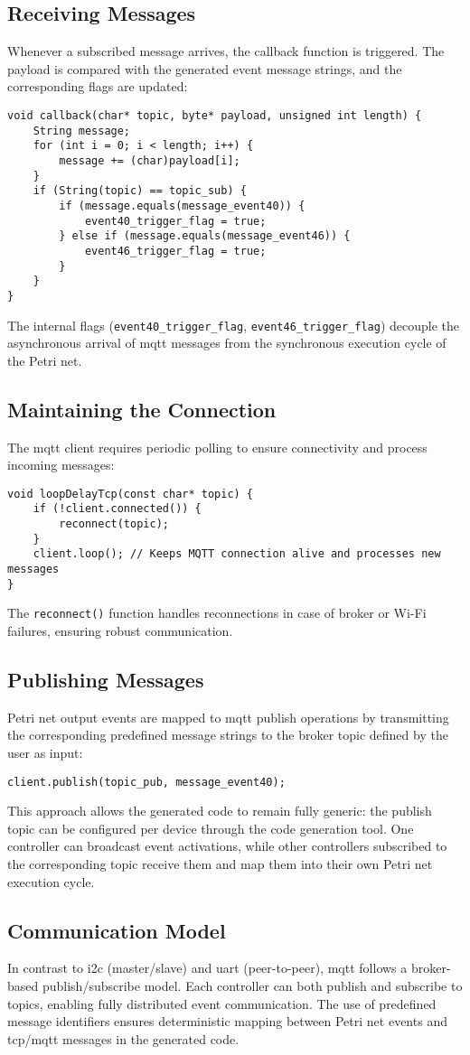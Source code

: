\subsection{Receiving Messages}
Whenever a subscribed message arrives, the callback function is triggered. The payload is compared with the generated event message strings, and the corresponding flags are updated:
\begin{verbatim}
void callback(char* topic, byte* payload, unsigned int length) {
    String message;
    for (int i = 0; i < length; i++) {
        message += (char)payload[i];
    }
    if (String(topic) == topic_sub) {
        if (message.equals(message_event40)) {
            event40_trigger_flag = true;
        } else if (message.equals(message_event46)) {
            event46_trigger_flag = true;
        }
    }
}
\end{verbatim}
The internal flags (\texttt{event40\_trigger\_flag}, \texttt{event46\_trigger\_flag}) decouple the asynchronous arrival of \gls{mqtt} messages from the synchronous execution cycle of the Petri net.

\subsection{Maintaining the Connection}
The \gls{mqtt} client requires periodic polling to ensure connectivity and process incoming messages:
\begin{verbatim}
void loopDelayTcp(const char* topic) {
    if (!client.connected()) {
        reconnect(topic);
    }
    client.loop(); // Keeps MQTT connection alive and processes new messages
}
\end{verbatim}
The \texttt{reconnect()} function handles reconnections in case of broker or Wi-Fi failures, ensuring robust communication.

\subsection{Publishing Messages}
Petri net output events are mapped to \gls{mqtt} publish operations by transmitting the corresponding predefined message strings to the broker topic defined by the user as input:
\begin{verbatim}
client.publish(topic_pub, message_event40);
\end{verbatim}
This approach allows the generated code to remain fully generic: the publish topic can be configured per device through the code generation tool. One controller can broadcast event activations, while other controllers subscribed to the corresponding topic receive them and map them into their own Petri net execution cycle.

\subsection{Communication Model}
In contrast to \gls{i2c} (master/slave) and \gls{uart} (peer-to-peer), \gls{mqtt} follows a broker-based publish/subscribe model. Each controller can both publish and subscribe to topics, enabling fully distributed event communication. The use of predefined message identifiers ensures deterministic mapping between Petri net events and \gls{tcp}/\gls{mqtt} messages in the generated code.